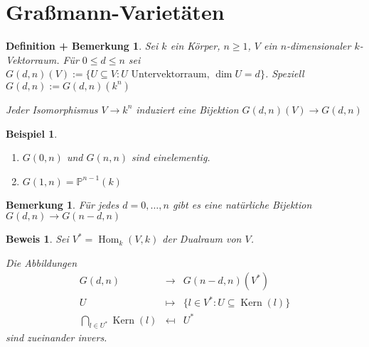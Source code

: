 \documentclass[a4paper, 12pt, numbers=noendperiod, chapterprefix=true]{scrbook}
\theoremstyle{break}
\newtheorem{DefBem}[Def]{Definition + Bemerkung}
\newtheorem{Bem}[Def]{Bemerkung}
\theoremstyle{nonumberbreak}
\newtheorem{nnBsp}{Beispiel}
\newtheorem{Bew}{Beweis}
\theoremstyle{nonumberplain}
\newcommand{\quot}[1]{\textrm{\glqq}{#1}\textrm{\grqq}}
\DeclareMathOperator{\Hom}{Hom}
\DeclareMathOperator{\Kern}{Kern}
\newcommand{\IP}{\mathbb{P}}%
\begin{document}
\section{Gra\ss mann-Variet\"aten}

\begin{DefBem}
Sei $k$ ein K\"orper, $n\ge1$, $V$ ein $n$-dimensionaler $k$-Vektorraum. F\"ur $0\le d\le n$ sei $G(d,n)(V):=\{U\subseteq V:U \text{ Untervektorraum, } \dim U=d\}$. \emph{Speziell} $G(d,n):=G(d,n)(k^n)$

Jeder Isomorphismus $V\to k^n$ induziert eine Bijektion $G(d,n)(V)\to G(d,n)$
\end{DefBem}

\begin{nnBsp}\begin{enumerate}[1)]
\item
	$G(0,n)$ und $G(n,n)$ sind einelementig.
\item
	$G(1,n)=\IP^{n-1}(k)$
\end{enumerate}\end{nnBsp}

\begin{Bem}
F\"ur jedes $d=0,\ldots ,n$ gibt es eine \quot{nat\"urliche} Bijektion $G(d,n)\to G(n-d,n)$
\end{Bem}

\begin{Bew}
Sei $V^*=\Hom_k(V,k)$ der Dualraum von $V$.

Die Abbildungen
	\[\begin{array}{rcl}
		G(d,n) &\to& G(n-d,n)(V^*)\\
		U &\mapsto& \{l\in V^* :U\subseteq \Kern(l)\}\\
		\bigcap\limits_{l\in U^*}\Kern(l) &\mapsfrom& U^*
	\end{array}\]
sind zueinander invers.
\end{Bew}
\end{document}
